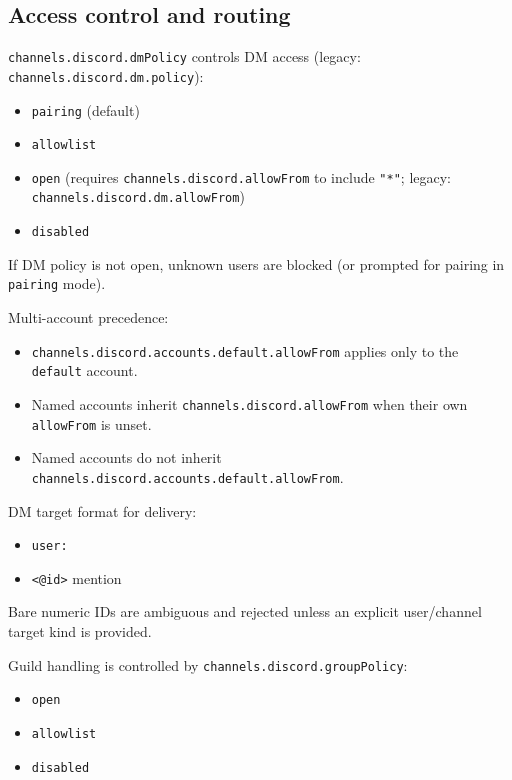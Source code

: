 \subsection{Access control and routing}


\texttt{channels.discord.dmPolicy} controls DM access (legacy: \texttt{channels.discord.dm.policy}):

\begin{itemize}
  \item \texttt{pairing} (default)
  \item \texttt{allowlist}
  \item \texttt{open} (requires \texttt{channels.discord.allowFrom} to include \texttt{"*"}; legacy: \texttt{channels.discord.dm.allowFrom})
  \item \texttt{disabled}
\end{itemize}


If DM policy is not open, unknown users are blocked (or prompted for pairing in \texttt{pairing} mode).

Multi-account precedence:

\begin{itemize}
  \item \texttt{channels.discord.accounts.default.allowFrom} applies only to the \texttt{default} account.
  \item Named accounts inherit \texttt{channels.discord.allowFrom} when their own \texttt{allowFrom} is unset.
  \item Named accounts do not inherit \texttt{channels.discord.accounts.default.allowFrom}.
\end{itemize}


DM target format for delivery:

\begin{itemize}
  \item \texttt{user:}
  \item \texttt{<@id>} mention
\end{itemize}


Bare numeric IDs are ambiguous and rejected unless an explicit user/channel target kind is provided.


Guild handling is controlled by \texttt{channels.discord.groupPolicy}:

\begin{itemize}
  \item \texttt{open}
  \item \texttt{allowlist}
  \item \texttt{disabled}
\end{itemize}


